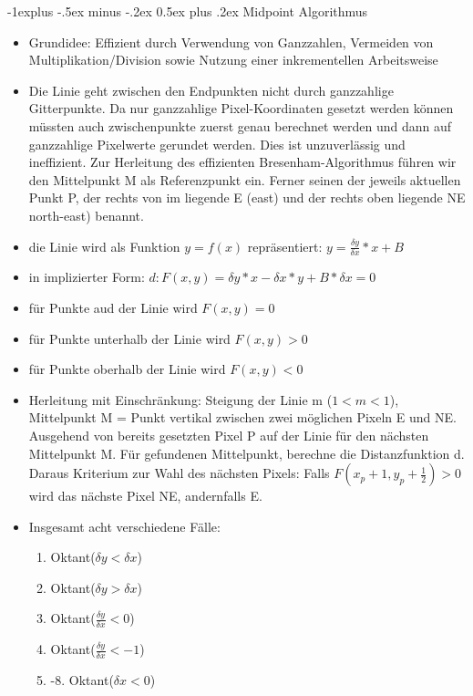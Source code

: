 \documentclass[10pt,landscape]{article}
\makeatletter
\renewcommand{\subsection}{\@startsection{subsection}{2}{0mm}%
                                {-1explus -.5ex minus -.2ex}%
                                {0.5ex plus .2ex}%
                                {\normalfont\normalsize\bfseries}}
\makeatother
\begin{document}
\begin{multicols}{3}
  \subsection{ Midpoint Algorithmus}
  \begin{itemize}
    \item Grundidee: Effizient durch Verwendung von Ganzzahlen, Vermeiden von Multiplikation/Division sowie Nutzung einer inkrementellen Arbeitsweise
    \item Die Linie geht zwischen den Endpunkten nicht durch ganzzahlige Gitterpunkte. Da nur ganzzahlige Pixel-Koordinaten gesetzt werden können müssten auch zwischenpunkte zuerst genau berechnet werden und dann auf ganzzahlige Pixelwerte gerundet werden. Dies ist unzuverlässig und ineffizient. Zur Herleitung des effizienten Bresenham-Algorithmus führen wir den Mittelpunkt M als Referenzpunkt ein. Ferner seinen der jeweils aktuellen Punkt P, der rechts von im liegende E (east) und der rechts oben liegende NE north-east) benannt.
    \item die Linie wird als Funktion $y=f(x)$ repräsentiert: $y=\frac{\delta y}{\delta x}*x+B$
    \item in implizierter Form: $d: F(x,y)=\delta y*x-\delta x*y+B*\delta x = 0$
    \item für Punkte aud der Linie wird $F(x,y)=0$
    \item für Punkte unterhalb der Linie wird $F(x,y)>0$
    \item für Punkte oberhalb der Linie wird $F(x,y)<0$
    \item Herleitung mit Einschränkung: Steigung der Linie m ($1 < m < 1$), Mittelpunkt M = Punkt vertikal zwischen zwei möglichen Pixeln E und NE. Ausgehend von bereits gesetzten Pixel P auf der Linie für den nächsten Mittelpunkt M. Für gefundenen Mittelpunkt, berechne die Distanzfunktion d. Daraus Kriterium zur Wahl des nächsten Pixels: Falls $F(x_p + 1, y_p+\frac{1}{2})>0$ wird das nächste Pixel NE, andernfalls E.
    \item Insgesamt acht verschiedene Fälle:
          \begin{enumerate}
            \item Oktant($\delta y < \delta x$)
            \item Oktant($\delta y > \delta x$)
            \item Oktant($\frac{\delta y}{\delta x}<  0$)
            \item Oktant($\frac{\delta y}{\delta x}< -1$)
            \item -8. Oktant($\delta x < 0$)
          \end{enumerate}
  \end{itemize}
  

\end{multicols}
\end{document}
